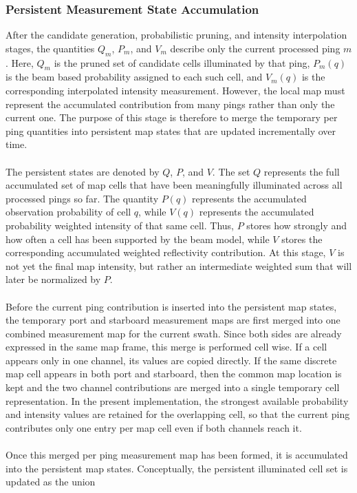 \subsubsection{Persistent Measurement State Accumulation}
After the candidate generation, probabilistic pruning, and intensity interpolation stages, the quantities $Q_m$, $P_m$, and $V_m$ describe only the current processed ping $m$. Here, $Q_m$ is the pruned set of candidate cells illuminated by that ping, $P_m(q)$ is the beam based probability assigned to each such cell, and $V_m(q)$ is the corresponding interpolated intensity measurement. However, the local map must represent the accumulated contribution from many pings rather than only the current one. The purpose of this stage is therefore to merge the temporary per ping quantities into persistent map states that are updated incrementally over time.
\\ \\
The persistent states are denoted by $Q$, $P$, and $V$. The set $Q$ represents the full accumulated set of map cells that have been meaningfully illuminated across all processed pings so far. The quantity $P(q)$ represents the accumulated observation probability of cell $q$, while $V(q)$ represents the accumulated probability weighted intensity of that same cell. Thus, $P$ stores how strongly and how often a cell has been supported by the beam model, while $V$ stores the corresponding accumulated weighted reflectivity contribution. At this stage, $V$ is not yet the final map intensity, but rather an intermediate weighted sum that will later be normalized by $P$.
\\ \\
Before the current ping contribution is inserted into the persistent map states, the temporary port and starboard measurement maps are first merged into one combined measurement map for the current swath. Since both sides are already expressed in the same map frame, this merge is performed cell wise. If a cell appears only in one channel, its values are copied directly. If the same discrete map cell appears in both port and starboard, then the common map location is kept and the two channel contributions are merged into a single temporary cell representation. In the present implementation, the strongest available probability and intensity values are retained for the overlapping cell, so that the current ping contributes only one entry per map cell even if both channels reach it.
\\ \\
Once this merged per ping measurement map has been formed, it is accumulated into the persistent map states. Conceptually, the persistent illuminated cell set is updated as the union
